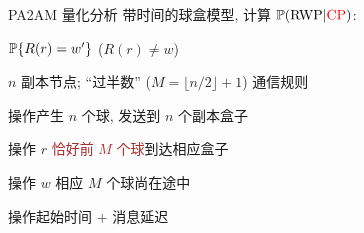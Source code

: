 \begin{frame}{PA2AM 量化分析}
  带时间的球盒模型, 计算 $\mathbb{P}(\textrm{RWP}|\textcolor{red}{\textrm{CP}})$:
	\begin{description}
	  \item<3->[建模目的:] $\mathbb{P}\{R(r) = w'\}$ ($R(r) \neq w$)
	  \item<4->[系统协议:] $n$ 副本节点; ``过半数'' {\small ($M = \lfloor n / 2 \rfloor + 1$)} 通信规则
	  \item<5->[球盒模型:] 操作产生 $n$ 个球, 发送到 $n$ 个副本盒子
	  \item<6->[时刻$t$:] 操作 $r$ \textcolor{brown}{恰好前 $M$ 个球}到达相应盒子
	  \item<7->[$R(r) \neq w$:] 操作 $w$ 相应 $M$ 个球尚在途中 
	  \item<8->[带时间:] 操作起始时间 + 消息延迟
	\end{description}

  \begin{figure}[h!]
    \centering
    \begin{adjustbox}{max totalsize = {0.50\textwidth}{1.00\textheight}, center}
      
    \end{adjustbox}
  \end{figure}
\end{frame}
